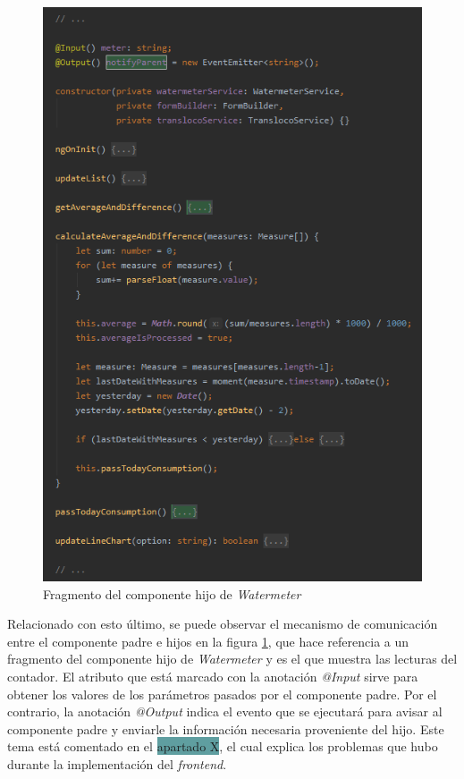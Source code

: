 \documentclass[pdftex,11pt,a4paper]{book}
\begin{document}
 \begin{figure}[h]
 \centering
 \includegraphics [scale=0.73] {images/implementacion/measures-ts.png}
 \caption{Fragmento del componente hijo de \textit{Watermeter}} \label{fig:measures-ts}
 \end{figure}

Relacionado con esto último, se puede observar el mecanismo de comunicación entre el componente padre e hijos en la figura \ref{fig:measures-ts}, que hace referencia a un fragmento del componente hijo de \textit{Watermeter} y es el que muestra las lecturas del contador. El atributo que está marcado con la anotación \textit{@Input} sirve para obtener los valores de los parámetros pasados por el componente padre. Por el contrario, la anotación \textit{@Output} indica el evento que se ejecutará para avisar al componente padre y enviarle la información necesaria proveniente del hijo. Este tema está comentado en el \colorbox{CadetBlue}{apartado X}, el cual explica los problemas que hubo durante la implementación del \textit{frontend}.
\end{document}
